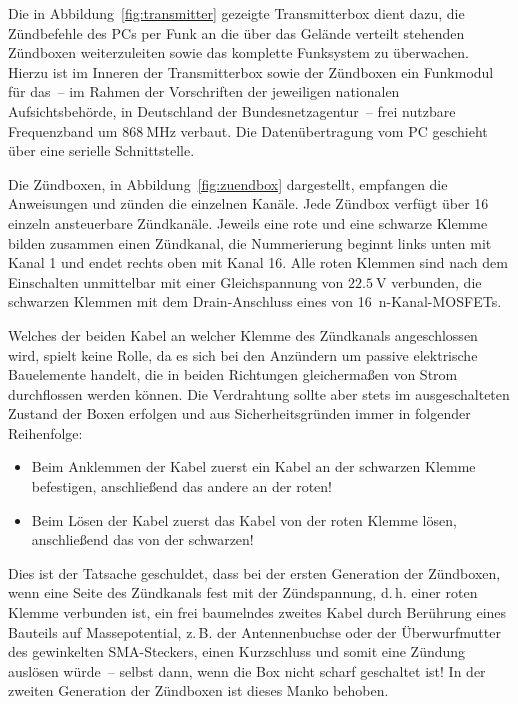\documentclass[paper=a4, parskip, numbers=noenddot, toc=listof, headsepline]{scrbook}
\begin{document}
			Die in Abbildung~\ref{fig:transmitter} gezeigte Transmitterbox dient dazu, die Zündbefehle des PCs per Funk an die über das Gelände verteilt stehenden Zündboxen weiterzuleiten sowie das komplette Funksystem zu überwachen. Hierzu ist im Inneren der Transmitterbox sowie der Zündboxen ein Funkmodul für das~-- im Rahmen der Vorschriften der jeweiligen nationalen Aufsichtsbehörde, in Deutschland der Bundesnetzagentur~-- frei nutzbare Frequenzband um $\SI{868}{\mega\hertz}$ verbaut. Die Datenübertragung vom PC geschieht über eine serielle Schnittstelle.

			Die Zündboxen, in Abbildung~\ref{fig:zuendbox} dargestellt, empfangen die Anweisungen und zünden die einzelnen Kanäle. Jede Zündbox verfügt über 16 einzeln ansteuerbare Zündkanäle. Jeweils eine rote und eine schwarze Klemme bilden zusammen einen Zündkanal, die Nummerierung beginnt links unten mit Kanal 1 und endet rechts oben mit Kanal 16. Alle roten Klemmen sind nach dem Einschalten unmittelbar mit einer Gleichspannung von $\SI{22,5}{\volt}$ verbunden, die schwarzen Klemmen mit dem Drain-Anschluss eines von 16~n-Kanal-MOSFETs.

			Welches der beiden Kabel an welcher Klemme des Zündkanals angeschlossen wird, spielt keine Rolle, da es sich bei den Anzündern um passive elektrische Bauelemente handelt, die in beiden Richtungen gleichermaßen von Strom durchflossen werden können. Die Verdrahtung sollte aber stets im ausgeschalteten Zustand der Boxen erfolgen und aus Sicherheitsgründen immer in folgender Reihenfolge:
			\begin{itemize}
				\item
				      Beim Anklemmen der Kabel zuerst ein Kabel an der schwarzen Klemme befestigen, anschließend das andere an der roten!
				\item
				      Beim Lösen der Kabel zuerst das Kabel von der roten Klemme lösen, anschließend das von der schwarzen!
			\end{itemize}
			Dies ist der Tatsache geschuldet, dass bei der ersten Generation der Zündboxen, wenn eine Seite des Zündkanals fest mit der Zündspannung, d.\,h. einer roten Klemme verbunden ist, ein frei baumelndes zweites Kabel durch Berührung eines Bauteils auf Massepotential, z.\,B. der Antennenbuchse oder der Überwurfmutter des gewinkelten SMA-Steckers, einen Kurzschluss und somit eine Zündung auslösen würde~-- selbst dann, wenn die Box nicht scharf geschaltet ist! In der zweiten Generation der Zündboxen ist dieses Manko behoben.
\end{document}
